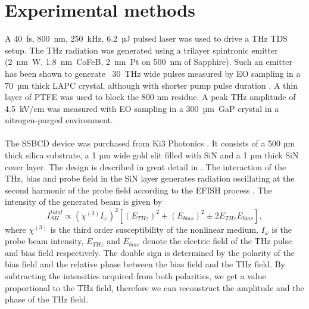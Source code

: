 \documentclass{article}
\begin{document}
\section{Experimental methods}
A \mbox{40 fs}, \mbox{800 nm}, \mbox{250 kHz}, \mbox{6.2 µJ} pulsed laser was used to drive a THz TDS setup. The THz radiation was generated using a trilayer spintronic emitter (\mbox{2 nm W}, \mbox{1.8 nm CoFeB}, \mbox{2 nm Pt} on \mbox{500 nm} of Sapphire). Such an emitter has been shown to generate \mbox{~30 THz} wide pulses measured by EO sampling in a \mbox{70 µm} thick LAPC crystal, although with shorter pump pulse duration \cite{seifert-2016}. A thin layer of PTFE was used to block the 800 nm residue. A peak THz amplitude of \mbox{4.5 kV/cm} was measured with EO sampling in a \mbox{300 µm GaP} crystal in a nitrogen-purged environment. 
\\~\\
The SSBCD device was purchased from Ki3 Photonics \cite{ki3photonics}. It consists of a 500 µm thick silica substrate, a 1 µm wide gold slit filled with SiN and a 1 µm thick SiN cover layer. The design is described in great detail in \cite{tomasino-2017, tomasino-2018}. 
The interaction of the THz, bias and probe field in the SiN layer generates radiation oscillating at the second harmonic of the probe field according to the EFISH process \cite{tomasino-2017}. The intensity of the generated beam is given by
\begin{equation}
I_{SH}^{total} \propto (\chi^{(3)} I_\omega)^2[(E_{THz})^2 + (E_{bias})^2  \pm 2E_{THz}E_{bias}],
\label{EFISH}
\end{equation}
where $\chi^{(3)}$ is the third order susceptibility of the nonlinear medium, $I_\omega$ is the probe beam intensity, $E_{THz}$ and $E_{bias}$ denote the electric field of the THz pulse and bias field respectively. The double sign is determined by the polarity of the bias field and the relative phase between the bias field and the THz field. By subtracting the intensities acquired from both polarities, we get a value proportional to the THz field, therefore we can reconstruct the amplitude and the phase of the THz field.
\end{document}
